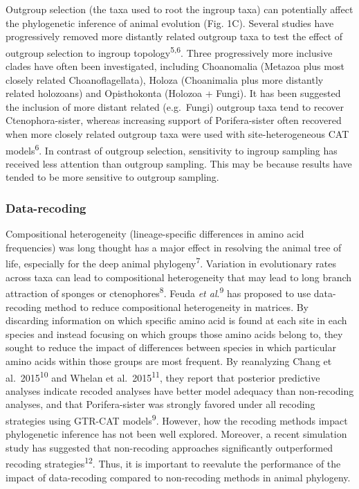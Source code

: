 \documentclass[]{article}
\begin{document}
Outgroup selection (the taxa used to root the ingroup taxa) can
potentially affect the phylogenetic inference of animal evolution (Fig.
1C). Several studies have progressively removed more distantly related
outgroup taxa to test the effect of outgroup selection to ingroup
topology\textsuperscript{5,6}. Three progressively more inclusive clades
have often been investigated, including Choanomalia (Metazoa plus most
closely related Choanoflagellata), Holoza (Choanimalia plus more
distantly related holozoans) and Opisthokonta (Holozoa + Fungi). It has
been suggested the inclusion of more distant related (e.g.~Fungi)
outgroup taxa tend to recover Ctenophora-sister, whereas increasing
support of Porifera-sister often recovered when more closely related
outgroup taxa were used with site-heterogeneous CAT
models\textsuperscript{6}. In contrast of outgroup selection,
sensitivity to ingroup sampling has received less attention than
outgroup sampling. This may be because results have tended to be more
sensitive to outgroup sampling.

\hypertarget{data-recoding}{%
\subsubsection{Data-recoding}\label{data-recoding}}

Compositional heterogeneity (lineage-specific differences in amino acid
frequencies) was long thought has a major effect in resolving the animal
tree of life, especially for the deep animal
phylogeny\textsuperscript{7}. Variation in evolutionary rates across
taxa can lead to compositional heterogeneity that may lead to long
branch attraction of sponges or ctenophores\textsuperscript{8}. Feuda
\emph{et al}.\textsuperscript{9} has proposed to use data-recoding
method to reduce compositional heterogeneity in matrices. By discarding
information on which specific amino acid is found at each site in each
species and instead focusing on which groups those amino acids belong
to, they sought to reduce the impact of differences between species in
which particular amino acids within those groups are most frequent. By
reanalyzing Chang et al.~2015\textsuperscript{10} and Whelan et
al.~2015\textsuperscript{11}, they report that posterior predictive
analyses indicate recoded analyses have better model adequacy than
non-recoding analyses, and that Porifera-sister was strongly favored
under all recoding strategies using GTR-CAT models\textsuperscript{9}.
However, how the recoding methods impact phylogenetic inference has not
been well explored. Moreover, a recent simulation study has suggested
that non-recoding approaches significantly outperformed recoding
strategies\textsuperscript{12}. Thus, it is important to reevalute the
performance of the impact of data-recoding compared to non-recoding
methods in animal phylogeny.
\end{document}
